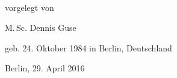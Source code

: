 \begin{titlepage}
    \begin{addmargin}[-1cm]{-3cm}
    \begin{center}
        \large  

        \hfill

        \vfill

        \begingroup
            \color{Maroon}\spacedallcaps{\myTitle} \\ \bigskip
        \endgroup

				\vspace{0.7cm}	
				vorgelegt von
				
				\vspace{0.7cm}	
				M.\,Sc. Dennis Guse
				
				geb. 24. Oktober 1984 in Berlin, Deutschland



%				
%				
%
%				
%
%				
%			



				\vspace{1cm}
				Berlin, 29. April 2016
%
%
%

        \vfill                      

    \end{center}  
  \end{addmargin}       
\end{titlepage}   